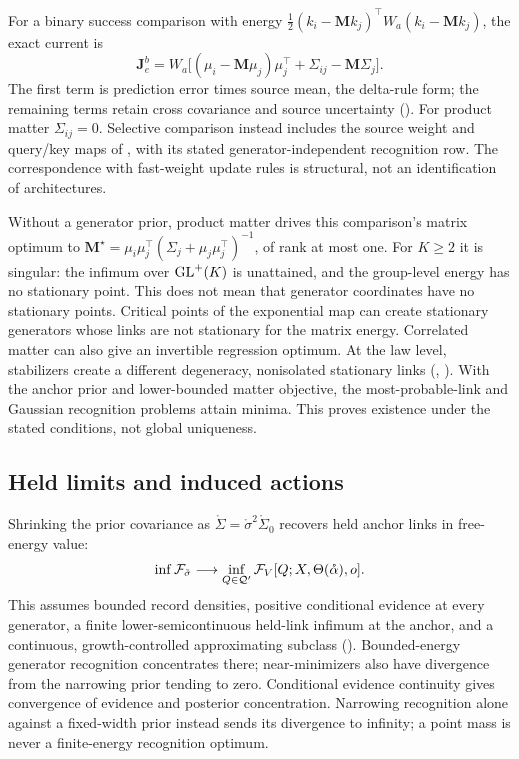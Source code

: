 For a binary success comparison with energy
$\tfrac12(k_i-\mathbf Mk_j)^\top W_a(k_i-\mathbf Mk_j)$, the exact current is
\[
\mathbf J^b_e=W_a\bigl[(\mu_i-\mathbf M\mu_j)\mu_j^\top
+\Sigma_{ij}-\mathbf M\Sigma_j\bigr].
\]
The first term is prediction error times source mean, the delta-rule form; the remaining
terms retain cross covariance and source uncertainty (). For product
matter $\Sigma_{ij}=0$. Selective comparison instead includes the source weight and query/key
maps of , with its stated generator-independent
recognition row. The correspondence with fast-weight update rules is structural, not an
identification of architectures.

Without a generator prior, product matter drives this comparison's matrix optimum to
$\mathbf M^\star=\mu_i\mu_j^\top(\Sigma_j+\mu_j\mu_j^\top)^{-1}$, of rank at most one.
For $K\geq2$ it is singular: the infimum over $\mathrm{GL}^+(K)$ is unattained, and the group-level
energy has no stationary point. This does not mean that generator coordinates have no
stationary points. Critical points of the exponential map can create stationary generators
whose links are not stationary for the matrix energy. Correlated matter can also give an
invertible regression optimum. At the law level, stabilizers create a different degeneracy,
nonisolated stationary links (,
). With the anchor prior and lower-bounded matter objective,
the most-probable-link and Gaussian recognition problems attain minima. This proves
existence under the stated conditions, not global uniqueness.

\subsection{Held limits and induced actions}

Shrinking the prior covariance as $\mathring\Sigma=\mathring\sigma^2\mathring\Sigma_0$
recovers held anchor links in free-energy value:
\[
\inf\mathcal F_{\mathring\sigma}\longrightarrow
\inf_{Q\in\mathcal Q'}\mathcal F_V[Q;X,\Theta(\mathring\alpha),o].
\]
This assumes bounded record densities, positive conditional evidence at every generator,
a finite lower-semicontinuous held-link infimum at the anchor, and a continuous,
growth-controlled approximating subclass (). Bounded-energy generator
recognition concentrates there; near-minimizers also have divergence from the narrowing prior
tending to zero. Conditional evidence continuity gives convergence of evidence and posterior
concentration. Narrowing recognition alone against a fixed-width prior instead sends its
divergence to infinity; a point mass is never a finite-energy recognition optimum.

